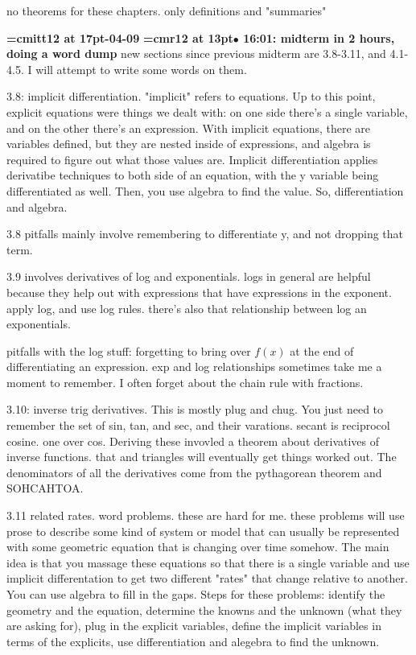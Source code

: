 no theorems for these chapters. only definitions and "summaries"
\par

{\medskip\noindent\bf\font\titlefont=cmitt12 at 17pt-04-09}\medskip
{\smallskip\noindent\bf\font\titlefont=cmr12 at 13pt\titlefont $\bullet$ 16:01: midterm in 2 hours, doing a word dump}\smallskip
new sections since previous midterm are 3.8-3.11, and 4.1-4.5. I will attempt to write some words on them.
\par

3.8: implicit differentiation. "implicit" refers to equations. Up to this point, explicit equations were things we dealt with: on one side there's a single variable, and on the other there's an expression. With implicit equations, there are variables defined, but they are nested inside of expressions, and algebra is required to figure out what those values are. Implicit differentiation applies derivatibe techniques to both side of an equation, with the y variable being differentiated as well. Then, you use algebra to find the value. So, differentiation and algebra.
\par

3.8 pitfalls mainly involve remembering to differentiate y, and not dropping that term.
\par

3.9 involves derivatives of log and exponentials. logs in general are helpful because they help out with expressions that have expressions in the exponent. apply log, and use log rules. there's also that relationship between log an exponentials.
\par

pitfalls with the log stuff: forgetting to bring over $f(x)$ at the end of differentiating an expression. exp and log relationships sometimes take me a moment to remember. I often forget about the chain rule with fractions.
\par

3.10: inverse trig derivatives. This is mostly plug and chug. You just need to remember the set of sin, tan, and sec, and their varations. secant is reciprocol cosine. one over cos. Deriving these invovled a theorem about derivatives of inverse functions. that and triangles will eventually get things worked out. The denominators of all the derivatives come from the pythagorean theorem and SOHCAHTOA.
\par

3.11 related rates. word problems. these are hard for me. these problems will use prose to describe some kind of system or model that can usually be represented with some geometric equation that is changing over time somehow. The main idea is that you massage these equations so that there is a single variable and use implicit differentation to get two different "rates" that change relative to another. You can use algebra to fill in the gaps. Steps for these problems: identify the geometry and the equation, determine the knowns and the unknown (what they are asking for), plug in the explicit variables, define the implicit variables in terms of the explicits, use differentiation and alegebra to find the unknown.
\par

